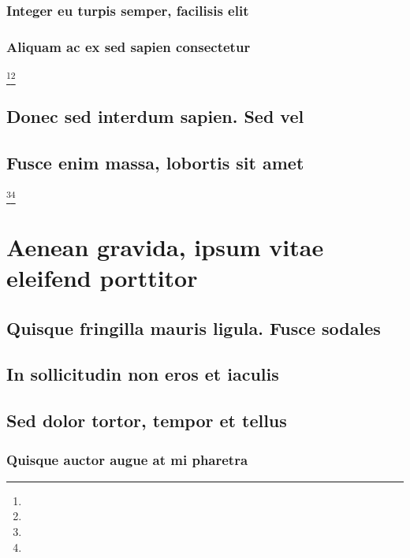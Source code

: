 \documentclass[%
  german,%
  exercise,%
  oneside,%
]{iswartcl}
\begin{document}
\lipsum[1-8]

\subsubsection{Integer eu turpis semper, facilisis elit}

\lipsum[1-8]

\subsubsection{Aliquam ac ex sed sapien consectetur}

\lipsum[1-8]\footnote{\lipsum[1]}\footnote{\lipsum[1]}

\subsection{Donec sed interdum sapien. Sed vel}

\lipsum[1-8]

\subsection{Fusce enim massa, lobortis sit amet}

\lipsum[1-8]\footnote{\lipsum[1]}\footnote{\lipsum[1]}

\section{Aenean gravida, ipsum vitae eleifend porttitor}

\lipsum[1-8]

\subsection{Quisque fringilla mauris ligula. Fusce sodales}

\lipsum[1-8]

\subsection{In sollicitudin non eros et iaculis}

\lipsum[1-8]

\subsection{Sed dolor tortor, tempor et tellus}

\lipsum[1-8]

\subsubsection{Quisque auctor augue at mi pharetra}
\end{document}
